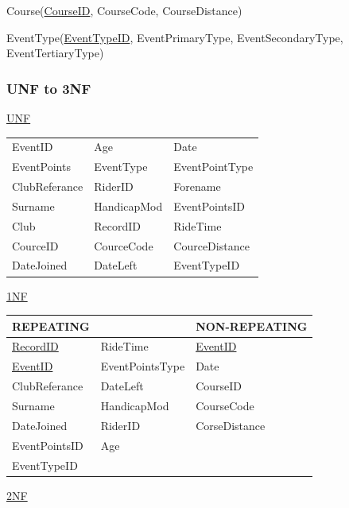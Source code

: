 Course(\underline{CourseID}, CourseCode, CourseDistance)

EventType(\underline{EventTypeID}, EventPrimaryType, EventSecondaryType, EventTertiaryType)

\subsubsection{UNF to 3NF}
\underline{UNF}


\begin{tabular}{l l l}
EventID        & Age              & Date               \\
EventPoints    & EventType        & EventPointType     \\
ClubReferance  & RiderID          & Forename           \\
Surname        & HandicapMod      & EventPointsID      \\
Club           & RecordID         & RideTime           \\
CourceID       & CourceCode       & CourceDistance     \\
DateJoined     & DateLeft         & EventTypeID        \\

\end{tabular}

\underline{1NF}

\begin{tabular}{|l l|l|}
\hline
REPEATING           &                 & NON-REPEATING       \\ \hline
\underline{RecordID}& RideTime        & \underline{EventID} \\ \hline
\underline{EventID} & EventPointsType & Date                \\ \hline
ClubReferance       & DateLeft        & CourseID            \\ \hline
Surname             & HandicapMod     & CourseCode          \\ \hline
DateJoined          & RiderID         & CorseDistance       \\ \hline 
EventPointsID       & Age             &                     \\ \hline
EventTypeID         &                 &                     \\ \hline
\end{tabular}




\underline{2NF}

